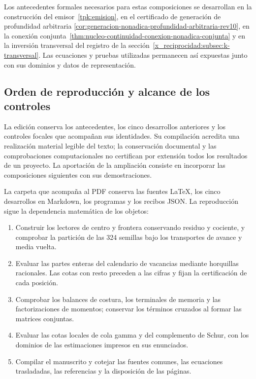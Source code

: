 Los antecedentes formales necesarios para estas composiciones se
desarrollan en la construcción del emisor~\ref{tpk:emision}, en el
certificado de generación de profundidad arbitraria
\ref{cor:generacion-nonadica-profundidad-arbitraria-rev10}, en la conexión
conjunta~\ref{thm:nucleo-continuidad-conexion-nonadica-conjunta} y en la
inversión transversal del registro de la
sección~\ref{x_reciprocidad:subsec:k-transversal}. Las ecuaciones y pruebas
utilizadas permanecen así expuestas junto con sus dominios y datos de
representación.

\clearpage
\subsection{Orden de reproducción y alcance de los controles}

La edición conserva los antecedentes, los cinco desarrollos anteriores y
los controles focales que acompañan sus identidades. Su compilación acredita
una realización material legible del texto; la conservación documental y
las comprobaciones computacionales no certifican por extensión todos los
resultados de un proyecto. La aportación de la ampliación consiste en
incorporar las composiciones siguientes con sus demostraciones.

La carpeta que acompaña al PDF conserva las fuentes \LaTeX{}, los cinco
desarrollos en Markdown, los programas y los recibos JSON. La reproducción
sigue la dependencia matemática de los objetos:

\begin{enumerate}
\item Construir los lectores de centro y frontera conservando residuo y
cociente, y comprobar la partición de las 324 semillas bajo los transportes
de avance y media vuelta.
\item Evaluar las partes enteras del calendario de vacancias mediante
horquillas racionales. Las cotas con resto preceden a las cifras y fijan
la certificación de cada posición.
\item Comprobar los balances de costura, los terminales de memoria y las
factorizaciones de momentos; conservar los términos cruzados al formar
las matrices conjuntas.
\item Evaluar las cotas locales de cola gamma y del complemento de Schur,
con los dominios de las estimaciones impresos en sus enunciados.
\item Compilar el manuscrito y cotejar las fuentes comunes, las ecuaciones
trasladadas, las referencias y la disposición de las páginas.
\end{enumerate}

